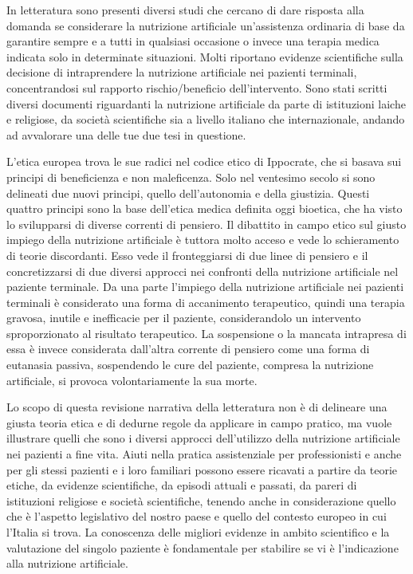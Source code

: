 \documentclass[12pt,a4paper,oneside]{book}
\begin{document}
In letteratura sono presenti diversi studi che cercano di dare risposta alla domanda se considerare la nutrizione artificiale un'assistenza ordinaria di base da garantire sempre e a tutti in qualsiasi occasione o invece una terapia medica indicata solo in determinate situazioni. Molti riportano evidenze scientifiche sulla decisione di intraprendere la nutrizione artificiale nei pazienti terminali, concentrandosi sul rapporto rischio/beneficio dell'intervento. 
Sono stati scritti diversi documenti riguardanti la nutrizione artificiale da parte di istituzioni laiche e religiose, da societ\`a scientifiche sia a livello italiano che internazionale, andando ad avvalorare una delle tue due tesi in questione. 

L'etica europea trova le sue radici nel codice etico di Ippocrate, che si basava sui principi di beneficienza e non maleficenza.  Solo nel ventesimo secolo si sono delineati due nuovi principi, quello dell'autonomia e della giustizia. Questi quattro principi sono la base dell'etica medica definita oggi bioetica, che ha visto lo svilupparsi di diverse correnti di pensiero. 
Il dibattito in campo etico sul giusto impiego della nutrizione artificiale \`e tuttora molto acceso e vede lo schieramento di teorie discordanti. Esso vede il fronteggiarsi di due linee di pensiero e il concretizzarsi di due diversi approcci nei confronti della nutrizione artificiale nel paziente terminale. Da una parte l'impiego della nutrizione artificiale nei pazienti terminali \`e considerato una forma di accanimento terapeutico, quindi una terapia gravosa, inutile e inefficacie per il paziente, considerandolo un intervento sproporzionato al risultato terapeutico. La sospensione o la mancata intrapresa di essa \`e invece considerata dall'altra corrente di pensiero come una forma di eutanasia passiva, sospendendo le cure del paziente, compresa la nutrizione artificiale, si provoca volontariamente la sua morte. 

Lo scopo di questa revisione narrativa della letteratura non \`e di delineare una giusta teoria etica e di dedurne regole da applicare in campo pratico, ma vuole illustrare quelli che sono i diversi approcci dell'utilizzo della nutrizione artificiale nei pazienti a fine vita. Aiuti nella pratica assistenziale per professionisti e anche per gli stessi pazienti e i loro familiari possono essere ricavati a partire da teorie etiche, da evidenze scientifiche, da episodi attuali e passati, da pareri di istituzioni religiose e societ\`a scientifiche, tenendo anche in considerazione quello che \`e l'aspetto legislativo del nostro paese e quello del contesto europeo in cui l'Italia si trova. 
La conoscenza delle migliori evidenze in ambito scientifico e la valutazione del singolo paziente \`e fondamentale per stabilire  se vi \`e l'indicazione alla nutrizione artificiale. 
\end{document}
